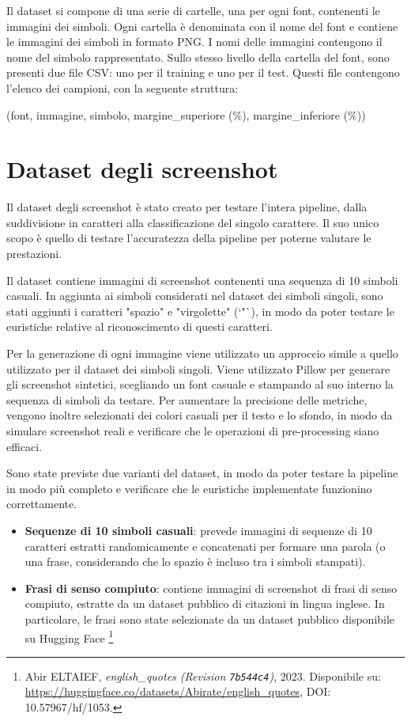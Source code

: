 Il dataset si compone di una serie di cartelle, una per ogni font, contenenti le immagini dei simboli. Ogni cartella è denominata con il nome del font e contiene le immagini dei simboli in formato PNG. I nomi delle immagini contengono il nome del simbolo rappresentato. Sullo stesso livello della cartella del font, sono presenti due file CSV: uno per il training e uno per il test. Questi file contengono l'elenco dei campioni, con la seguente struttura:
\begin{center}
(font, immagine, simbolo, margine\_superiore (\%), margine\_inferiore (\%))
\end{center}

\section{Dataset degli screenshot}
\label{sec:dataset_screenshots}

Il dataset degli screenshot è stato creato per testare l'intera pipeline, dalla suddivisione in caratteri alla classificazione del singolo carattere. Il suo unico scopo è quello di testare l'accuratezza della pipeline per poterne valutare le prestazioni. 

Il dataset contiene immagini di screenshot contenenti una sequenza di 10 simboli casuali. In aggiunta ai simboli considerati nel dataset dei simboli singoli, sono stati aggiunti i caratteri "spazio" e "virgolette" (`"`), in modo da poter testare le euristiche relative al riconoscimento di questi caratteri.

Per la generazione di ogni immagine viene utilizzato un approccio simile a quello utilizzato per il dataset dei simboli singoli. Viene utilizzato Pillow per generare gli screenshot sintetici, scegliando un font casuale e stampando al suo interno la sequenza di simboli da testare.
Per aumentare la precisione delle metriche, vengono inoltre selezionati dei colori casuali per il testo e lo sfondo, in modo da simulare screenshot reali e verificare che le operazioni di pre-processing siano efficaci.

Sono state previste due varianti del dataset, in modo da poter testare la pipeline in modo più completo e verificare che le euristiche implementate funzionino correttamente.

\begin{itemize}
	\item \textbf{Sequenze di 10 simboli casuali}: prevede immagini di sequenze di 10 caratteri estratti randomicamente e concatenati per formare una parola (o una frase, considerando che lo spazio è incluso tra i simboli stampati).
	\item \textbf{Frasi di senso compiuto}: contiene immagini di screenshot di frasi di senso compiuto, estratte da un dataset pubblico di citazioni in lingua inglese. In particolare, le frasi sono state selezionate da un dataset pubblico disponibile su Hugging Face \footnote{Abir ELTAIEF, \textit{english\_quotes (Revision \texttt{7b544c4})}, 2023. Disponibile su: \url{https://huggingface.co/datasets/Abirate/english_quotes}, DOI: 10.57967/hf/1053.}
\end{itemize}




